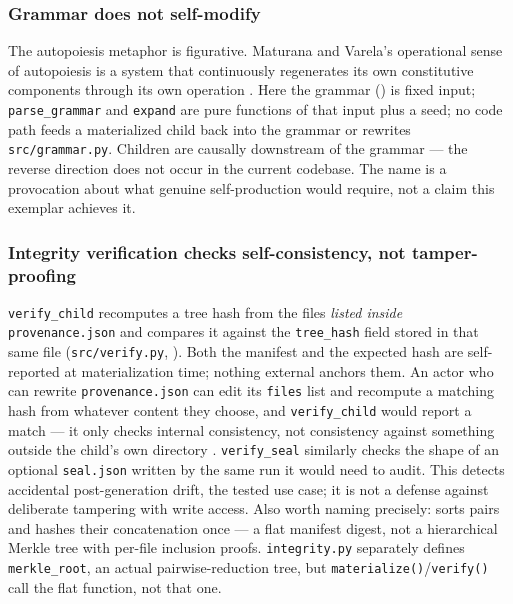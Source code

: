 \documentclass[
]{article}
\begin{document}
\subsubsection{Grammar does not
self-modify}\label{grammar-does-not-self-modify}

The autopoiesis metaphor is figurative. Maturana and Varela's
operational sense of autopoiesis is a system that continuously
regenerates its own constitutive components through its own operation
\citep{maturana_varela_1980}. Here the grammar
() is fixed input;
\texttt{parse\_grammar} and \texttt{expand} are pure functions of that
input plus a seed; no code path feeds a materialized child back into the
grammar or rewrites \texttt{src/grammar.py}. Children are causally
downstream of the grammar --- the reverse direction does not occur in
the current codebase. The name is a provocation about what genuine
self-production would require, not a claim this exemplar achieves it.

\subsubsection{Integrity verification checks self-consistency, not
tamper-proofing}\label{integrity-verification-checks-self-consistency-not-tamper-proofing}

\texttt{verify\_child} recomputes a tree hash from the files
\emph{listed inside} \texttt{provenance.json} and compares it against
the \texttt{tree\_hash} field stored in that same file
(\texttt{src/verify.py}, ). Both the manifest
and the expected hash are self-reported at materialization time; nothing
external anchors them. An actor who can rewrite \texttt{provenance.json}
can edit its \texttt{files} list and recompute a matching hash from
whatever content they choose, and \texttt{verify\_child} would report a
match --- it only checks internal consistency, not consistency against
something outside the child's own directory
\citep{merkle_tree_provenance}. \texttt{verify\_seal} similarly checks
the shape of an optional \texttt{seal.json} written by the same run it
would need to audit. This detects accidental post-generation drift, the
tested use case; it is not a defense against deliberate tampering with
write access. Also worth naming precisely:
 sorts
 pairs and hashes their concatenation once
--- a flat manifest digest, not a hierarchical Merkle tree with per-file
inclusion proofs. \texttt{integrity.py} separately defines
\texttt{merkle\_root}, an actual pairwise-reduction tree, but
\texttt{materialize()}/\texttt{verify()} call the flat function, not
that one.
\end{document}
